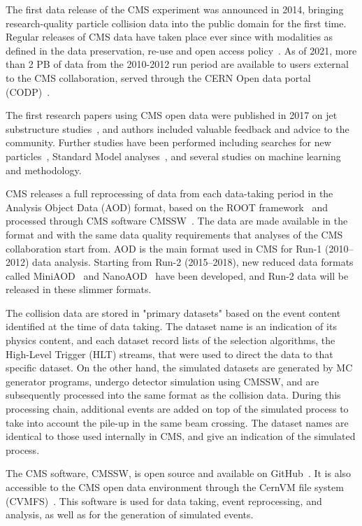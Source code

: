 \documentclass[]{article}
\begin{document}
The first data release of the CMS experiment was announced in 2014, bringing research-quality particle collision data into the public domain for the first time. Regular releases of CMS data have taken place ever since with modalities as defined in the data preservation, re-use and open access policy~\cite{cmsopendata}. As of 2021, more than 2 PB of data from the 2010-2012 run period are available to users external to the CMS collaboration, served through the CERN Open data portal (CODP)~\cite{opendataportal}.

The first research papers using CMS open data were published in 2017 on jet substructure
studies~\cite{Tripathee:2017ybi,Larkoski:2017bvj}, and authors included valuable feedback and advice to the community. Further studies have been performed including searches for new particles~\cite{Cesarotti:2019nax,Lester:2019bso}, Standard Model analyses~\cite{Apyan:2019ybx}, and several studies on machine learning and methodology.

CMS releases a full reprocessing of data from each data-taking period in the Analysis Object Data (AOD) format, based on the ROOT framework~\cite{Brun:1997pa} and processed through CMS software CMSSW~\cite{cmssw}. The data are made available in the format and with the same data quality requirements that analyses of the CMS collaboration start from. AOD is the main format used in CMS for Run-1 (2010–2012) data analysis. Starting from Run-2 (2015–2018), new reduced data formats called MiniAOD~\cite{Petrucciani:2015gjw} and NanoAOD~\cite{Ehataht:2020ebp} have been developed, and Run-2 data will be released in these slimmer formats.

The collision data are stored in "primary datasets" based on the event content identified at the time of data taking. The dataset name is an indication of its physics content, and each dataset record lists of the selection algorithms, the High-Level Trigger (HLT) streams, that were used to direct the data to that specific dataset. On the other hand, the simulated datasets are generated by MC generator programs, undergo detector simulation using CMSSW, and are subsequently processed into the same format as the collision data. During this processing chain, additional events are added on top of the simulated
process to take into account the pile-up in the same beam crossing. The dataset names are identical to those used internally in CMS, and give an indication of the simulated process.

The CMS software, CMSSW, is open source and available on GitHub~\cite{cmssw}. It is also accessible to the CMS open data environment through the CernVM file system (CVMFS)~\cite{blomer_jakob_2020_4114078}. This software is used for data taking, event reprocessing, and analysis, as well as for the generation of simulated events.
\end{document}
